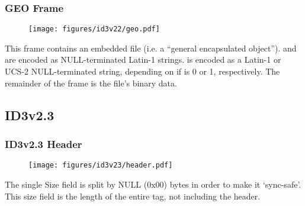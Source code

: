 \subsubsection{GEO Frame}
\begin{figure}[h]
  \texttt{[image: figures/id3v22/geo.pdf]}
\end{figure}
\par
\noindent
This frame contains an embedded file (i.e. a ``general encapsulated object'').
 and  are encoded as NULL-terminated
Latin-1 strings.
 is encoded as a Latin-1 or UCS-2 NULL-terminated
string, depending on if  is 0 or 1, respectively.
The remainder of the frame is the file's binary data.

\clearpage

\subsection{ID3v2.3}
\subsubsection{ID3v2.3 Header}
\begin{figure}[h]
\texttt{[image: figures/id3v23/header.pdf]}
\end{figure}
\par
\noindent
The single Size field is split by NULL (0x00) bytes in order to make
it `sync-safe'.
This size field is the length of the entire tag, not including the header.

